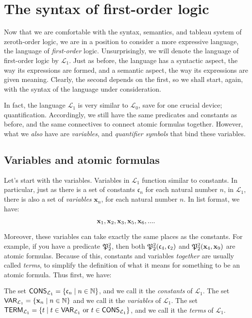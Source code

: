 \chapter{The syntax of first-order logic}

Now that we are comfortable with the syntax, semantics, and tableau system of zeroth-order logic, we are in a position to consider a more expressive language, the language of \textit{first-order} logic. Unsurprisingly, we will denote the language of first-order logic by $\mathcal{L}_1$. Just as before, the language has a syntactic aspect, the way its expressions are formed, and a semantic aspect, the way its expressions are given meaning. Clearly, the second depends on the first, so we shall start, again, with the syntax of the language under consideration. 

In fact, the language $\mathcal{L}_1$ is very similar to $\mathcal{L}_0$, save for one crucial device; quantification. Accordingly, we still have the same predicates and constants as before, and the same connectives to connect atomic formulas together. However, what we \textit{also} have are \textit{variables}, and \textit{quantifier symbols} that bind these variables. 

\section{Variables and atomic formulas}

Let's start with the variables. Variables in $\mathcal{L}_1$ function similar to constants. In particular, just as there is a set of constants $\mathfrak{c}_n$ for each natural number $n$, in $\mathcal{L}_1$, there is also a set of \textit{variables} $\mathbf{x}_n$, for each natural number $n$. In list format, we have:

\[
\mathbf{x}_{1}, \mathbf{x}_{2}, \mathbf{x}_{3}, \mathbf{x}_{5}, \mathbf{x}_{6}, ....
\]


Moreover, these variables can take exactly the same places as the constants. For example, if you have a predicate $\mathfrak{P}^{2}_{2}$, then both $\mathfrak{P}^{2}_{2}(\mathfrak{c}_{4}, \mathfrak{c}_{2})$ and $\mathfrak{P}^{2}_{2}(\mathbf{x}_{4}, \mathbf{x}_{9})$ are atomic formulas. Because of this, constants and variables \textit{together} are usually called \textit{terms}, to simplify the definition of what it means for something to be an atomic formula. Thus first, we have:

\begin{defn}
The set $\mathsf{CONS}_{\mathcal{L}_1}=\{\mathfrak{c}_{n} \mid n \in \mathbb{N}\}$, and we call it the \textit{constants} of $\mathcal{L}_1$. The set $\mathsf{VAR}_{\mathcal{L}_1}=\{\mathbf{x}_{n} \mid n \in \mathbb{N}\}$ and we call it the \textit{variables} of $\mathcal{L}_1$. The set $\mathsf{TERM}_{\mathcal{L}_1}=\{t \mid t \in \textsf{VAR}_{\mathcal{L}_1} \text{ or } t \in \textsf{CONS}_{\mathcal{L}_1}\}$, and we call it the \textit{terms} of $\mathcal{L}_1$. 
\end{defn}

